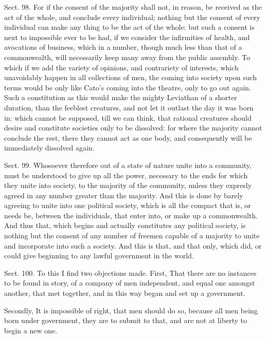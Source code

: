 \documentclass[11pt,openany]{book}
\begin{document}
Sect. 98. For if the consent of the majority shall not, in reason, be received as the act of the whole, and conclude every individual; nothing but the consent of every individual can make any thing to be the act of the whole: but such a consent is next to impossible ever to be had, if we consider the infirmities of health, and avocations of business, which in a number, though much less than that of a commonwealth, will necessarily keep many away from the public assembly. To which if we add the variety of opinions, and contrariety of interests, which unavoidably happen in all collections of men, the coming into society upon such terms would be only like Cato's coming into the theatre, only to go out again. Such a constitution as this would make the mighty Leviathan of a shorter duration, than the feeblest creatures, and not let it outlast the day it was born in: which cannot be supposed, till we can think, that rational creatures should desire and constitute societies only to be dissolved: for where the majority cannot conclude the rest, there they cannot act as one body, and consequently will be immediately dissolved again.

Sect. 99. Whosoever therefore out of a state of nature unite into a community, must be understood to give up all the power, necessary to the ends for which they unite into society, to the majority of the community, unless they expresly agreed in any number greater than the majority. And this is done by barely agreeing to unite into one political society, which is all the compact that is, or needs be, between the individuals, that enter into, or make up a commonwealth. And thus that, which begins and actually constitutes any political society, is nothing but the consent of any number of freemen capable of a majority to unite and incorporate into such a society. And this is that, and that only, which did, or could give beginning to any lawful government in the world.

Sect. 100. To this I find two objections made. First, That there are no instances to be found in story, of a company of men independent, and equal one amongst another, that met together, and in this way began and set up a government.

Secondly, It is impossible of right, that men should do so, because all men being born under government, they are to submit to that, and are not at liberty to begin a new one.
\end{document}
